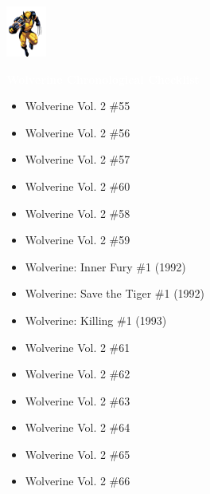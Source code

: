 \documentclass[12pt]{article}
\newcommand{\checkbox}{\raisebox{0.0ex}{\fbox{\rule{0ex}{1.5ex} \rule{1.5ex}{0ex}}}}
\begin{document}
\newpage
{}
\begin{center}
    \vspace*{2cm}
    \includegraphics[width=0.1\textwidth]{wolverine.png}
    \vspace{0.3cm}

    {\Huge \textbf{\textcolor{white}{Wolverine Chronological Checklist}}}
\end{center}
\vspace{0.3cm}
\noindent
\begin{tcolorbox}[
  colback=white!95!gray, colframe=black,
  width=\textwidth, arc=4mm, auto outer arc,
  boxrule=0.8pt,
  left=8pt,right=8pt,top=8pt,bottom=8pt
]
\begin{itemize}[left=0pt,label={\checkbox}]
  \item Wolverine Vol. 2 \#55
  \item Wolverine Vol. 2 \#56
  \item Wolverine Vol. 2 \#57
  \item Wolverine Vol. 2 \#60
  \item Wolverine Vol. 2 \#58
  \item Wolverine Vol. 2 \#59
  \item Wolverine: Inner Fury \#1 (1992)
  \item Wolverine: Save the Tiger \#1 (1992)
  \item Wolverine: Killing \#1 (1993)
  \item Wolverine Vol. 2 \#61
  \item Wolverine Vol. 2 \#62
  \item Wolverine Vol. 2 \#63
  \item Wolverine Vol. 2 \#64
  \item Wolverine Vol. 2 \#65
  \item Wolverine Vol. 2 \#66
\end{itemize}
\end{tcolorbox}
\end{document}
